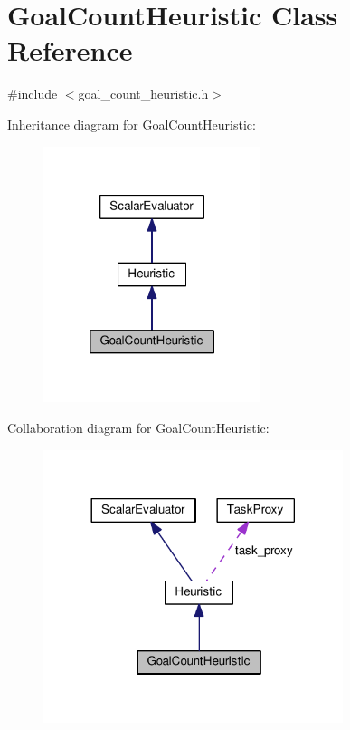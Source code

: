 \hypertarget{classGoalCountHeuristic}{\section{Goal\-Count\-Heuristic Class Reference}
\label{classGoalCountHeuristic}
}


{\ttfamily \#include $<$goal\-\_\-count\-\_\-heuristic.\-h$>$}



Inheritance diagram for Goal\-Count\-Heuristic\-:
\nopagebreak
\begin{figure}[H]
\begin{center}
\leavevmode
\includegraphics[width=180pt]{classGoalCountHeuristic__inherit__graph}
\end{center}
\end{figure}


Collaboration diagram for Goal\-Count\-Heuristic\-:
\nopagebreak
\begin{figure}[H]
\begin{center}
\leavevmode
\includegraphics[width=248pt]{classGoalCountHeuristic__coll__graph}
\end{center}
\end{figure}
